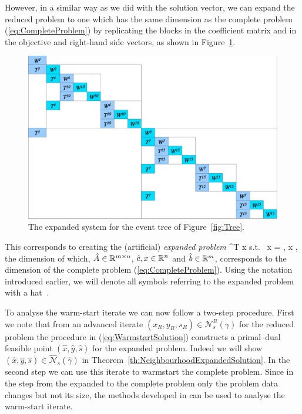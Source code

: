 However, in a similar way as we did with the solution vector, 
we can expand the reduced problem to one which has the same dimension 
as the complete problem (\ref{eq:CompleteProblem}) by replicating
the blocks in the coefficient matrix and in the objective and right-hand 
side vectors, as shown in Figure~\ref{fig:ExpandedSystem}.
%
\begin{figure}[ht]
  \begin{center}
    \includegraphics[scale=.50]{figures/expandedsystem.eps}
    \caption{The expanded system for the event tree of Figure~\ref{fig:Tree}.}
    \label{fig:ExpandedSystem}
  \end{center}
  \vspace{-3ex}
\end{figure}

This corresponds to creating the (artificial) {\em expanded problem}
\be \label{eq:ExpandedProblem}
\min\; ^T x \;\quad \mbox{s.t. }\;  x = ,
    \; x ,
\ee
the dimension of which, $\hat{A} \in \mathbb{R}^{m\times n}$, 
$\hat{c}, x \in \mathbb{R}^{n}$ and $\hat{b} \in \mathbb{R}^{m}$,
corresponds to the dimension of the complete problem 
(\ref{eq:CompleteProblem}).
Using the notation introduced earlier, we will denote 
all symbols referring to the expanded problem with a hat $\hat{\ }$.

To analyse the warm-start iterate we can now follow a two-step
procedure. First we note that from an advanced iterate 
$(x_R, y_R,  s_R)\in\mathcal{N}^R_s(\gamma)$ for the reduced
problem the procedure in (\ref{eq:WarmstartSolution}) constructs a
primal--dual feasible point $(\hat{x}, \hat{y}, \hat{s})$ for the 
expanded problem. Indeed we will show 
$(\hat{x}, \hat{y}, \hat{s})\in\hat{\mathcal{N}}_s(\hat{\gamma})$
in Theorem~\ref{th:NeighbourhoodExpandedSolution}. In the second step we
can use this iterate to warmstart the complete problem. Since in the
step from the expanded to the complete problem only the problem data
changes but not its size, the methods developed in
\cite{GondzioGrothey03,YildirimWright} can be used to analyse the 
warm-start iterate.

